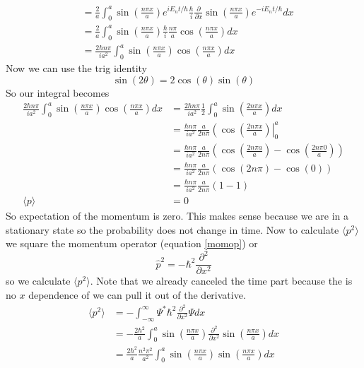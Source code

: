 \documentclass[11pt]{article}
\numberwithin{equation}{section}
\newcommand{\expt}[1]{\langle{#1}\rangle}
\begin{document}
\begin{enumerate}[(a)]
\begin{align*}
&= \frac{2}{a}\int_{0}^{a}\sin\left(\frac{n\pi x}{a}\right)e^{iE_nt/\hbar}\frac{\hbar}{i}\frac{\partial}{\partial x}\sin\left(\frac{n\pi x}{a}\right)e^{-iE_nt/\hbar}dx\\
&= \frac{2}{a}\int_{0}^{a}\sin\left(\frac{n\pi x}{a}\right)\frac{\hbar}{i}\frac{n\pi}{a}\cos\left(\frac{n\pi x}{a}\right)dx\\
&= \frac{2\hbar n\pi}{ia^2}\int_{0}^{a}\sin\left(\frac{n\pi x}{a}\right)\cos\left(\frac{n\pi x}{a}\right)dx
\end{align*}
Now we can use the trig identity 
\begin{equation}
\sin(2\theta) = 2\cos(\theta)\sin(\theta)
\end{equation}
So our integral becomes 
\begin{align*}
\frac{2\hbar n\pi}{ia^2}\int_{0}^{a}\sin\left(\frac{n\pi x}{a}\right)\cos\left(\frac{n\pi x}{a}\right)dx &= \frac{2\hbar n\pi}{ia^2}\frac{1}{2}\int_{0}^{a}\sin\left(\frac{2n\pi x}{a}\right)dx\\
&= \frac{\hbar n\pi}{ia^2}\frac{a}{2n\pi}\left(\cos\left(\frac{2n\pi x}{a}\right)\right|_0^a\\
&= \frac{\hbar n\pi}{ia^2}\frac{a}{2n\pi}\left(\cos\left(\frac{2n\pi a}{a}\right) - \cos\left(\frac{2n\pi 0}{a}\right)\right)\\
&= \frac{\hbar n\pi}{ia^2}\frac{a}{2n\pi}\left(\cos\left(2n\pi\right) - \cos\left(0\right)\right)\\
&= \frac{\hbar n\pi}{ia^2}\frac{a}{2n\pi}\left(1-1\right)\\
\expt{p} &= 0
\end{align*}
So expectation of the momentum is zero. This makes sense because we are in a stationary state so the probability does not change in time. Now to calculate $\expt{p^2}$ we square the momentum operator (equation \ref{momop}) or
$$\hat{p}^2 = -\hbar^2\frac{\partial^2}{\partial x^2}$$
so we calculate $\expt{p^2}$. Note that we already canceled the time part because the is no $x$ dependence of we can pull it out of the derivative.
\begin{align*}
\expt{p^2} &= -\int_{-\infty}^{\infty}\Psi^*{\hbar^2}\frac{\partial^2}{\partial x^2}\Psi dx\\
&= -\frac{2\hbar^2}{a}\int_{0}^{a}\sin\left(\frac{n\pi x}{a}\right)\frac{\partial^2}{\partial x^2}\sin\left(\frac{n\pi x}{a}\right)dx\\
&= \frac{2\hbar^2}{a}\frac{n^2\pi^2}{a^2}\int_{0}^{a}\sin\left(\frac{n\pi x}{a}\right)\sin\left(\frac{n\pi x}{a}\right)dx\\

\end{align*}
\end{enumerate}
\end{document}
